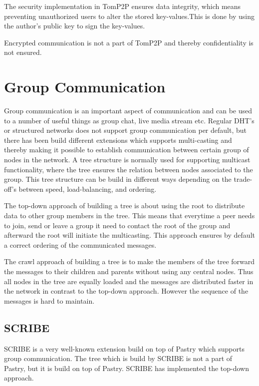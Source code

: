 The security implementation in TomP2P ensures data integrity, which means preventing unauthorized users to alter the stored key-values.This is done by using the author's public key to sign the key-values.

Encrypted communication is not a part of TomP2P and thereby confidentiality is not ensured.


\section{Group Communication}
Group communication is an important aspect of communication and can be used to a number of useful things as group chat, live media stream etc.
Regular DHT's or structured networks does not support group communication per default, but there has been build different extensions which supports multi-casting and thereby making it possible to establish communication between certain group of nodes in the network. 
A tree structure is normally used for supporting multicast functionality, where the tree ensures the relation between nodes associated to the group. This tree structure can be build in different ways depending on the trade-off's between speed, load-balancing, and ordering.

The top-down approach of building a tree is about using the root to distribute data to other group members in the tree. This means that everytime a peer needs to join, send or leave a group it need to contact the root of the group and afterward the root will initiate the multicasting. This approach ensures by default a correct ordering of the communicated messages. 

The crawl approach of building a tree is to make the members of the tree forward the messages to their children and parents without using any central nodes. Thus all nodes in the tree are equally loaded and the messages are distributed faster in the network in contrast to the top-down approach. However the sequence of the messages is hard to maintain. 

\subsection{SCRIBE}
SCRIBE is a very well-known extension build on top of Pastry which supports group communication. 
The tree which is build by SCRIBE is not a part of Pastry, but it is build on top of Pastry. SCRIBE has implemented the top-down approach. 


